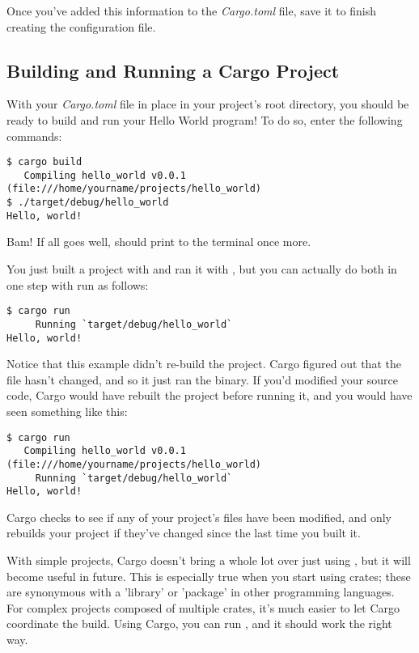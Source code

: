 \blank

Once you've added this information to the \emph{Cargo.toml} file, save it to finish creating the configuration file.

\subsection*{Building and Running a Cargo Project}

With your \emph{Cargo.toml} file in place in your project's root directory, you should be ready to build and run your 
Hello World program! To do so, enter the following commands:

\begin{verbatim}
$ cargo build
   Compiling hello_world v0.0.1 (file:///home/yourname/projects/hello_world)
$ ./target/debug/hello_world
Hello, world! 
\end{verbatim}

Bam! If all goes well,  should print to the terminal once more.

\blank

You just built a project with  and ran it with , but you can actually do 
both in one step with  run as follows:

\begin{verbatim}
$ cargo run
     Running `target/debug/hello_world`
Hello, world!  
\end{verbatim}

Notice that this example didn't re-build the project. Cargo figured out that the file hasn't changed, and so it just 
ran the binary. If you'd modified your source code, Cargo would have rebuilt the project before running it, and you 
would have seen something like this:

\begin{verbatim}
$ cargo run
   Compiling hello_world v0.0.1 (file:///home/yourname/projects/hello_world)
     Running `target/debug/hello_world`
Hello, world!  
\end{verbatim}

Cargo checks to see if any of your project's files have been modified, and only rebuilds your project if they've changed since 
the last time you built it.

\blank

With simple projects, Cargo doesn't bring a whole lot over just using , but it will become useful in future. This 
is especially true when you start using crates; these are synonymous with a 'library' or 'package' in other programming languages. 
For complex projects composed of multiple crates, it's much easier to let Cargo coordinate the build. Using Cargo, you can run 
, and it should work the right way.

